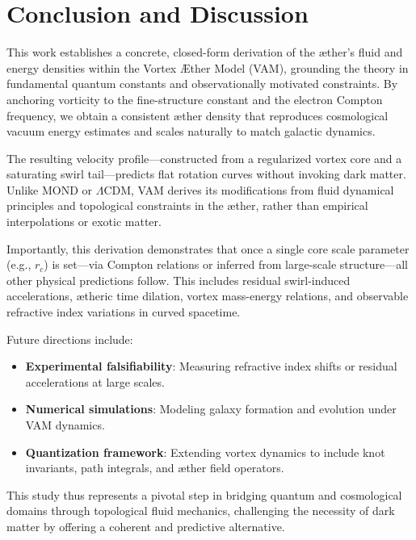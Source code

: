 \documentclass[12pt]{article}
\begin{document}
\section{Conclusion and Discussion}

This work establishes a concrete, closed-form derivation of the æther’s fluid and energy densities within the Vortex \AE{}ther Model (VAM), grounding the theory in fundamental quantum constants and observationally motivated constraints. By anchoring vorticity to the fine-structure constant and the electron Compton frequency, we obtain a consistent æther density that reproduces cosmological vacuum energy estimates and scales naturally to match galactic dynamics.

The resulting velocity profile—constructed from a regularized vortex core and a saturating swirl tail—predicts flat rotation curves without invoking dark matter. Unlike MOND or $\Lambda$CDM, VAM derives its modifications from fluid dynamical principles and topological constraints in the æther, rather than empirical interpolations or exotic matter.

Importantly, this derivation demonstrates that once a single core scale parameter (e.g., \( r_c \)) is set—via Compton relations or inferred from large-scale structure—all other physical predictions follow. This includes residual swirl-induced accelerations, ætheric time dilation, vortex mass-energy relations, and observable refractive index variations in curved spacetime.

Future directions include:
\begin{itemize}
    \item \textbf{Experimental falsifiability}: Measuring refractive index shifts or residual accelerations at large scales.
    \item \textbf{Numerical simulations}: Modeling galaxy formation and evolution under VAM dynamics.
    \item \textbf{Quantization framework}: Extending vortex dynamics to include knot invariants, path integrals, and æther field operators.
\end{itemize}

This study thus represents a pivotal step in bridging quantum and cosmological domains through topological fluid mechanics, challenging the necessity of dark matter by offering a coherent and predictive alternative.





\end{document}
